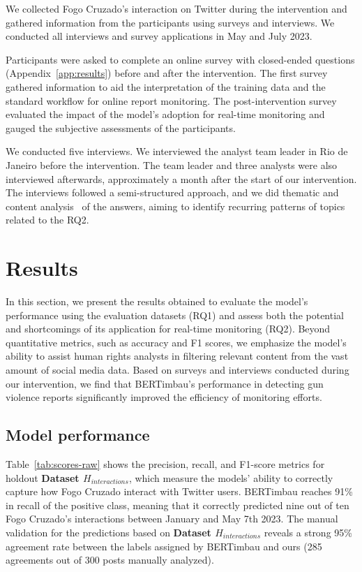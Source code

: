 \documentclass[11pt,letterpaper]{article}
\begin{document}
We collected Fogo Cruzado's interaction on Twitter during the intervention and gathered information from the participants using surveys and interviews. We conducted all interviews and survey applications in May and July 2023.

Participants were asked to complete an online survey with closed-ended questions (Appendix~\ref{app:results}) before and after the intervention. The first survey gathered information to aid the interpretation of the training data and the standard workflow for online report monitoring. The post-intervention survey evaluated the impact of the model's adoption for real-time monitoring and gauged the subjective assessments of the participants. 

We conducted five interviews. We interviewed the analyst team leader in Rio de Janeiro before the intervention. The team leader and three analysts were also interviewed afterwards, approximately a month after the start of our intervention. The interviews followed a semi-structured approach, and we did thematic and content analysis~\citep{rossmanIntroductionQualitativeResearch2017} of the answers, aiming to identify recurring patterns of topics related to the RQ2.

\section{Results}
\label{chap:results}
In this section, we present the results obtained to evaluate the model's performance using the evaluation datasets (RQ1) and assess both the potential and shortcomings of its application for real-time monitoring (RQ2). Beyond quantitative metrics, such as accuracy and F1 scores, we emphasize the model's ability to assist human rights analysts in filtering relevant content from the vast amount of social media data. Based on surveys and interviews conducted during our intervention, we find that BERTimbau's performance in detecting gun violence reports significantly improved the efficiency of monitoring efforts.

\subsection{Model performance}

Table~\ref{tab:scores-raw} shows the precision, recall, and F1-score metrics for holdout \textbf{Dataset $ H_{interactions} $}, which measure the models' ability to correctly capture how Fogo Cruzado interact with Twitter users. BERTimbau reaches 91\% in recall of the positive class, meaning that it correctly predicted nine out of ten Fogo Cruzado's interactions between January and May 7th 2023. The manual validation for the predictions based on \textbf{Dataset $ H_{interactions} $} reveals a strong 95\% agreement rate between the labels assigned by BERTimbau and ours (285 agreements out of 300 posts manually analyzed).
\end{document}
